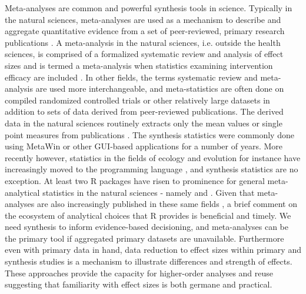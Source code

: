 \documentclass[softwarereview]{jss}
\begin{document}
Meta-analyses are common and powerful synthesis tools in science.  Typically in the natural sciences, meta-analyses are used as a mechanism to describe and aggregate quantitative evidence from a set of peer-reviewed, primary research publications \citep{RN3629, RN4850}.  A meta-analysis in the natural sciences, i.e. outside the health sciences, is comprised of a formalized systematic review and analysis of effect sizes and is termed a meta-analysis when statistics examining intervention efficacy are included \citep{RN3216}.  In other fields, the terms systematic review and meta-analysis are used more interchangeable, and meta-statistics are often done on compiled randomized controlled trials or other relatively large datasets in addition to sets of data derived from peer-reviewed publications.  The derived data in the natural sciences routinely extracts only the mean values or single point measures from publications \citep{RN4861}.  The synthesis statistics were commonly done using MetaWin \citep{RN6194} or other GUI-based applications for a number of years.  More recently however, statistics in the fields of ecology and evolution for instance have increasingly moved to the programming language  \citep{RN6098}, and synthesis statistics are no exception.  At least two R packages have risen to prominence for general meta-analytical statistics in the natural sciences - namely  \citep{RN6176} and  \citep{RN6175}.  Given that meta-analyses are also increasingly published in these same fields \citep{RN2189, RN3629}, a brief comment on the ecosystem of analytical choices that R provides is beneficial and timely.  We need synthesis to inform evidence-based decisioning, and meta-analyses can be the primary tool if aggregated primary datasets are unavailable.  Furthermore even with primary data in hand, data reduction to effect sizes within primary and synthesis studies is a mechanism to illustrate differences and strength of effects.  These approaches provide the capacity for higher-order analyses and reuse \citep{RN4835} suggesting that familiarity with effect sizes is both germane and practical.  \newline
\end{document}
